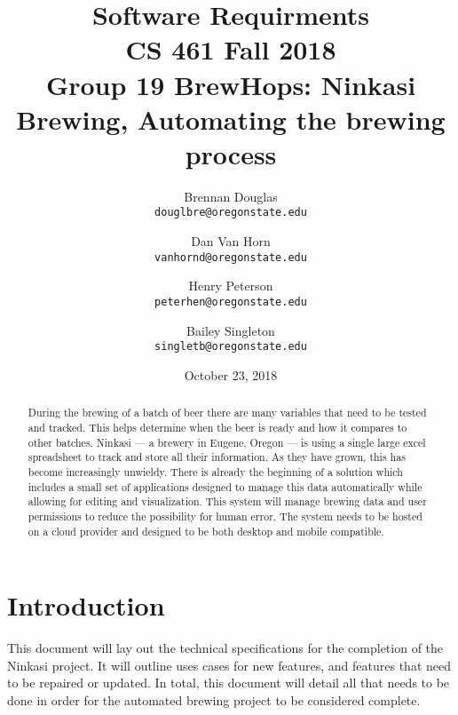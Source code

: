 \documentclass[draftclsnofoot,onecolumn,journal,letterpaper,compsoc,10pt]{IEEEtran}
\date{October 23, 2018}
\begin{document}
\begin{titlingpage}
    \title{Software Requirments\\\large CS 461 Fall 2018\\Group 19 BrewHops: Ninkasi Brewing, Automating the brewing process}
    \author{
        Brennan Douglas \\
        \texttt{douglbre@oregonstate.edu} \\
        \and
        Dan Van Horn \\
        \texttt{vanhornd@oregonstate.edu} \\
        \and
        Henry Peterson \\
        \texttt{peterhen@oregonstate.edu} \\
        \and
        Bailey Singleton \\
        \texttt{singletb@oregonstate.edu} \\
    }
    \maketitle
    \begin{abstract}
    	During the brewing of a batch of beer there are many variables that need to be tested and tracked. This helps determine when the beer is ready and how it compares to other batches. Ninkasi --- a brewery in Eugene, Oregon --- is using a single large excel spreadsheet to track and store all their information. As they have grown, this has become increasingly unwieldy. There is already the beginning of a solution which includes a small set of applications designed to manage this data automatically while allowing for editing and visualization. This system will manage brewing data and user permissions to reduce the possibility for human error. The system needs to be hosted on a cloud provider and designed to be both desktop and mobile compatible.
    \end{abstract}
    \pagebreak
    \tableofcontents
\end{titlingpage}

\section{Introduction}

This document will lay out the technical specifications for the completion of the Ninkasi project.  It will outline uses cases for new features, and features that need to be repaired or updated.  In total, this document will detail all that needs to be done in order for the automated brewing project to be considered complete.
\end{document}

